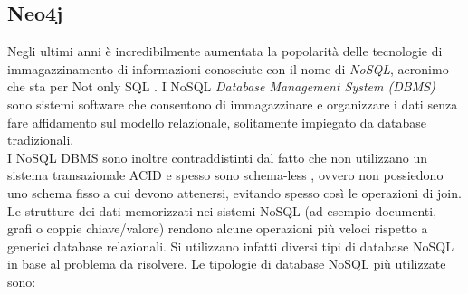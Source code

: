 \subsection{Neo4j}
\label{sec:neo4j}
Negli ultimi anni è incredibilmente aumentata la popolarità delle tecnologie di immagazzinamento di informazioni conosciute con il nome di \textit{NoSQL}, acronimo che sta per Not only SQL \cite{neo4j:NoSQL}. I NoSQL \textit{Database Management System (DBMS)} sono sistemi software che consentono di immagazzinare e organizzare i dati senza fare affidamento sul modello relazionale, solitamente impiegato da database tradizionali.
\\I NoSQL DBMS sono inoltre contraddistinti dal fatto che non utilizzano un sistema transazionale ACID e spesso sono schema-less \cite{neo4j:NoSQL}, ovvero non possiedono uno schema fisso a cui devono attenersi, evitando spesso così le operazioni di join.
\\Le strutture dei dati memorizzati nei sistemi NoSQL (ad esempio documenti, grafi o coppie chiave/valore) rendono alcune operazioni più veloci rispetto a generici database relazionali. Si utilizzano infatti diversi tipi di database NoSQL in base al problema da risolvere. Le tipologie di database NoSQL più utilizzate sono:
